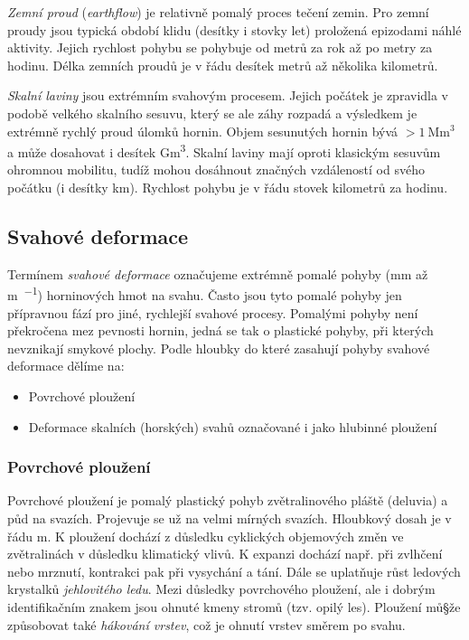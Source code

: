 \emph{Zemní proud} (\textit{earthflow}) je relativně pomalý proces tečení zemin. Pro zemní proudy jsou typická období klidu (desítky i stovky let) proložená epizodami náhlé aktivity. Jejich rychlost pohybu se pohybuje od metrů za rok až po metry za hodinu. Délka zemních proudů je v řádu desítek metrů až několika kilometrů.

\emph{Skalní laviny} jsou extrémním svahovým procesem. Jejich počátek je zpravidla v podobě velkého skalního sesuvu, který se ale záhy rozpadá a výsledkem je extrémně rychlý proud úlomků hornin. Objem sesunutých hornin bývá $> \SI{1}{\mega\metre\cubed}$ a může dosahovat i desítek \si{\giga\metre\cubed}.
Skalní laviny mají oproti klasickým sesuvům ohromnou mobilitu, tudíž mohou dosáhnout značných vzdáleností od svého počátku (i desítky \si{\kilo\metre}). Rychlost pohybu je v řádu stovek kilometrů za hodinu.

\subsection{Svahové deformace}
Termínem \emph{svahové deformace} označujeme extrémně pomalé pohyby (\si{\milli\metre} až \si{\metre\per\rok}) horninových hmot na svahu. Často jsou tyto pomalé pohyby jen přípravnou fází pro jiné, rychlejší svahové procesy. Pomalými pohyby není překročena mez pevnosti hornin, jedná se tak o plastické pohyby, při kterých nevznikají smykové plochy. Podle hloubky do které zasahují pohyby svahové deformace dělíme na:

\begin{itemize}
	\item Povrchové ploužení
	\item Deformace skalních (horských) svahů označované i jako hlubinné ploužení
\end{itemize}

\subsubsection{Povrchové ploužení}
Povrchové ploužení je pomalý plastický pohyb zvětralinového pláště (deluvia) a půd na svazích. Projevuje se už na velmi mírných svazích. Hloubkový dosah je v řádu \si{\metre}. K ploužení dochází z důsledku cyklických objemových změn ve zvětralinách v důsledku klimatický vlivů. K expanzi dochází např. při zvlhčení nebo mrznutí, kontrakci pak při vysychání a tání. Dále se uplatňuje růst ledových krystalků \emph{jehlovitého ledu}. Mezi důsledky povrchového ploužení, ale i dobrým identifikačním znakem jsou ohnuté kmeny stromů (tzv. opilý les). Ploužení mů§že způsobovat také  \emph{hákování vrstev}, což je ohnutí vrstev směrem po svahu. 

